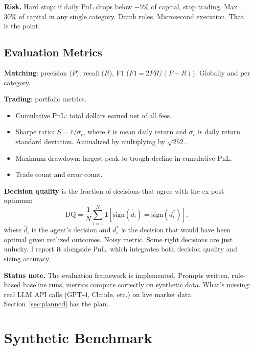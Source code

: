 \documentclass[11pt]{article}
\theoremstyle{definition}
\theoremstyle{remark}
\begin{document}
\textbf{Risk.} Hard stop: if daily PnL drops below $-5\%$ of capital, stop trading. Max 30\% of capital in any single category. Dumb rules. Microsecond execution. That is the point.

\subsection{Evaluation Metrics}
\label{sec:metrics}

\textbf{Matching}: precision ($P$), recall ($R$), F1 ($F1 = 2PR/(P+R)$). Globally and per category.

\textbf{Trading}: portfolio metrics.
\begin{itemize}
  \item Cumulative PnL: total dollars earned net of all fees.
  \item Sharpe ratio: $S = \bar{r} / \sigma_r$, where $\bar{r}$ is mean daily return and $\sigma_r$ is daily return standard deviation. Annualized by multiplying by $\sqrt{252}$.
  \item Maximum drawdown: largest peak-to-trough decline in cumulative PnL.
  \item Trade count and error count.
\end{itemize}

\textbf{Decision quality} is the fraction of decisions that agree with the ex-post optimum:
\begin{equation}
\label{eq:dq}
\text{DQ} = \frac{1}{N}\sum_{i=1}^{N} \mathbf{1}\!\left[\text{sign}(\hat{d}_i) = \text{sign}(d_i^*)\right],
\end{equation}
where $\hat{d}_i$ is the agent's decision and $d_i^*$ is the decision that would have been optimal given realized outcomes. Noisy metric. Some right decisions are just unlucky. I report it alongside PnL, which integrates both decision quality and sizing accuracy.

\medskip
\noindent\textbf{Status note.} The evaluation framework is implemented. Prompts written, rule-based baseline runs, metrics compute correctly on synthetic data. What's missing: real LLM API calls (GPT-4, Claude, etc.) on live market data. Section~\ref{sec:planned} has the plan.

\section{Synthetic Benchmark}
\label{sec:synthetic}
\end{document}
